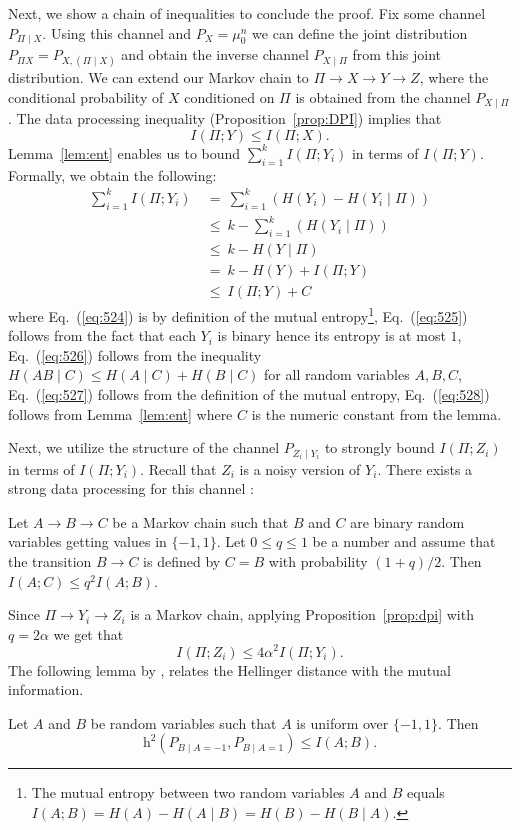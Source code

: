 \documentclass[final, 12pt]{colt2018}
\providecommand{\helli}{\mathrm{h}}
\renewcommand{\eqref}[1]{Eq.~(\ref{#1})}
\newcommand{\lemref}[1]{Lemma~\ref{#1}}
\begin{document}
Next, we show a chain of inequalities to conclude the proof. Fix some channel $P_{\Pi \mid X}$. Using this channel and $P_X=\mu_0^n$ we can define the joint distribution $P_{\Pi X} = P_{X, (\Pi \mid X)}$ and obtain the inverse channel $P_{X \mid \Pi}$ from this joint distribution. We can extend our Markov chain to $\Pi \to X \to Y \to Z$, where the conditional probability of $X$ conditioned on $\Pi$ is obtained from the channel $P_{X\mid\Pi}$. The data processing inequality (Proposition~\ref{prop:DPI}) implies that 
\begin{equation} \label{eq:YX}
I(\Pi ; Y) \le I(\Pi ; X).
\end{equation}
Lemma~\ref{lem:ent} enables us to bound $\sum_{i=1}^k I(\Pi;Y_i)$ in terms of $I(\Pi; Y)$. Formally, we obtain the following:
\begin{align}
\sum_{i=1}^k I(\Pi ; Y_i)
&~=~ \sum_{i=1}^k \left(H(Y_i) - H(Y_i \mid \Pi) \right) \label{eq:524} \\
&~\le~ k - \sum_{i=1}^k \left(H(Y_i \mid \Pi) \right)\label{eq:525}\\
&~\le~ k - H(Y \mid \Pi) \label{eq:526} \\
&~=~ k - H(Y) + I(\Pi ; Y) \label{eq:527}\\
&~\le~ I(\Pi ; Y) + C \label{eq:528}
\end{align}
where \eqref{eq:524} is by definition of the mutual entropy\footnote{The mutual entropy between two random variables $A$ and $B$ equals $I(A;B) = H(A) - H(A\mid B) = H(B) - H(B \mid A)$.}, \eqref{eq:525} follows from the fact that each $Y_i$ is binary hence its entropy is at most $1$, \eqref{eq:526} follows from the inequality $H(AB\mid C) \le H(A\mid C)+H(B\mid C)$ for all random variables $A,B,C$, \eqref{eq:527} follows from the definition of the mutual entropy, \eqref{eq:528} follows from \lemref{lem:ent} where $C$ is the numeric constant from the lemma. 

Next, we utilize the structure of the channel $P_{Z_i\mid Y_i}$ to strongly bound $I(\Pi;Z_i)$ in terms of $I(\Pi;Y_i)$. Recall that $Z_i$ is a noisy version of $Y_i$. There exists a strong data processing for this channel \citep{ahlswede1976spreading}:
\begin{proposition} \label{prop:dpi}
Let $A \to B \to C$ be a Markov chain such that $B$ and $C$ are binary random variables getting values in $\{-1,1\}$. Let $0 \le q \le 1$ be a number and assume that the transition $B \to C$ is defined by $C = B$ with probability $(1+q)/2$.
Then $I(A ; C) \le q^2 I(A ; B)$.
\end{proposition}
Since $\Pi \to Y_i \to Z_i$ is a Markov chain, applying Proposition~\ref{prop:dpi} with $q = 2 \alpha$ we get that 
\begin{equation} \label{eq:ZiYi}
I(\Pi ; Z_i) \le 4 \alpha^2 I(\Pi ; Y_i).
\end{equation}
The following lemma by \citet[Lemma~6.2]{bar2004information}, relates the Hellinger distance with the mutual information.
\begin{lemma} \label{lem:hel-I}
Let $A$ and $B$ be random variables such that $A$ is uniform over $\{-1,1\}$. Then
\[
\helli^2(P_{B\mid A=-1}, P_{B \mid A=1}) \le I(A; B).
\]
\end{lemma}
\end{document}
